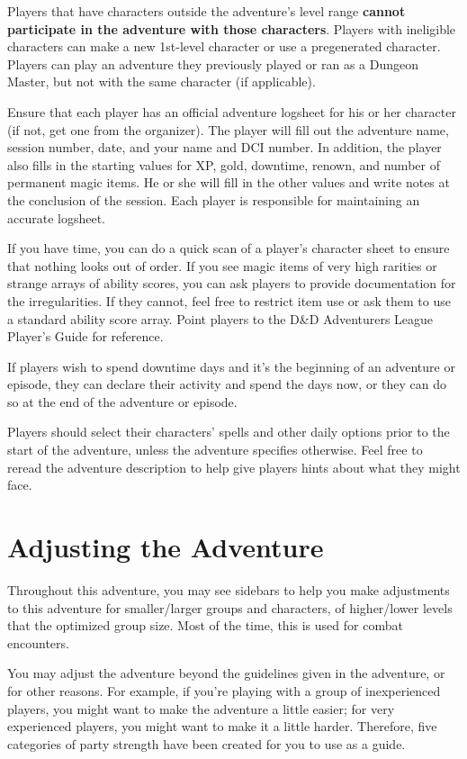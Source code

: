 \documentclass[10pt,a4paper,twoside,bg=print,twocolumn,openany,nodeprecatedcode]{dndbook}
\begin{document}
Players that have characters outside the adventure's level range \textbf{cannot participate in the adventure with those characters}. Players with ineligible characters can make a new 1st-level character or use a pregenerated character. Players can play an adventure they previously played or ran as a Dungeon Master, but not with the same character (if applicable).

Ensure that each player has an official adventure logsheet for his or her character (if not, get one from the organizer). The player will fill out the adventure name, session number, date, and your name and DCI number. In addition, the player also fills in the starting values for XP, gold, downtime, renown, and number of permanent magic items. He or she will fill in the other values and write notes at the conclusion of the session. Each player is responsible for maintaining an accurate logsheet.

If you have time, you can do a quick scan of a player's character sheet to ensure that nothing looks out of order. If you see magic items of very high rarities or strange arrays of ability scores, you can ask players to provide documentation for the irregularities. If they cannot, feel free to restrict item use or ask them to use a standard ability score array. Point players to the D\&D Adventurers League Player's Guide for reference.

If players wish to spend downtime days and it's the beginning of an adventure or episode, they can declare their activity and spend the days now, or they can do so at the end of the adventure or episode.

Players should select their characters' spells and other daily options prior to the start of the adventure, unless the adventure specifies otherwise. Feel free to reread the adventure description to help give players hints about what they might face.

\section{Adjusting the Adventure}
Throughout this adventure, you may see sidebars to help you make adjustments to this adventure for smaller/larger groups and characters, of higher/lower levels that the optimized group size. Most of the time, this is used for combat encounters.

You may adjust the adventure beyond the guidelines given in the adventure, or for other reasons. For example, if you're playing with a group of inexperienced players, you might want to make the adventure a little easier; for very experienced players, you might want to make it a little harder. Therefore, five categories of party strength have been created for you to use as a guide.
\end{document}
